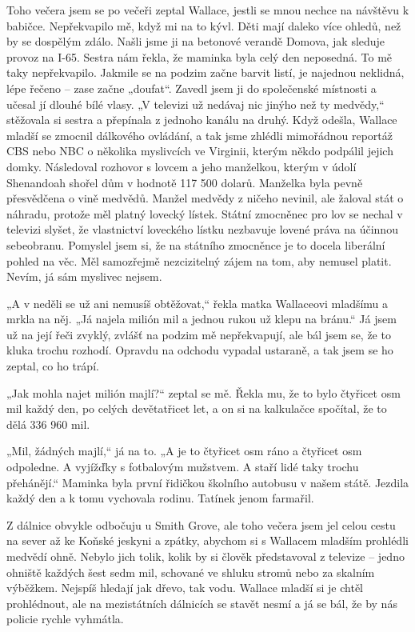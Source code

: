 Toho večera jsem se po večeři zeptal Wallace, jestli se mnou nechce na návštěvu k babičce. Nepřekvapilo mě, když mi na to kývl. Děti mají daleko více ohledů, než by se dospělým zdálo. Našli jsme ji na betonové verandě Domova, jak sleduje provoz na I-65. Sestra nám řekla, že maminka byla celý den neposedná. To mě taky nepřekvapilo. Jakmile se na podzim začne barvit listí, je najednou neklidná, lépe řečeno – zase začne „doufat“. Zavedl jsem ji do společenské místnosti a učesal jí dlouhé bílé vlasy. „V televizi už nedávaj nic jinýho než ty medvědy,“ stěžovala si sestra a přepínala z jednoho kanálu na druhý. Když odešla, Wallace mladší se zmocnil dálkového ovládání, a tak jsme zhlédli mimořádnou reportáž CBS nebo NBC o několika myslivcích ve Virginii, kterým někdo podpálil jejich domky. Následoval rozhovor s lovcem a jeho manželkou, kterým v údolí Shenandoah shořel dům v hodnotě 117 500 dolarů. Manželka byla pevně přesvědčena o vině medvědů. Manžel medvědy z ničeho nevinil, ale žaloval stát o náhradu, protože měl platný lovecký lístek. Státní zmocněnec pro lov se nechal v televizi slyšet, že vlastnictví loveckého lístku nezbavuje  lovené  práva na účinnou sebeobranu.  Pomyslel jsem si, že na státního zmocněnce je to docela liberální pohled na věc. Měl samozřejmě nezcizitelný zájem na tom, aby nemusel platit. Nevím, já sám myslivec nejsem.

„A v neděli se už ani nemusíš obtěžovat,“ řekla matka Wallaceovi mladšímu a mrkla na něj. „Já najela milión mil a jednou rukou už klepu na bránu.“ Já jsem už na její řeči zvyklý, zvlášť na podzim mě nepřekvapují, ale bál jsem se, že to kluka trochu rozhodí. Opravdu na odchodu vypadal ustaraně, a tak jsem se ho zeptal, co ho trápí.

„Jak mohla najet milión majlí?“ zeptal se mě. Řekla mu, že to bylo čtyřicet osm mil každý den, po celých devětatřicet let, a on si na kalkulačce spočítal, že to dělá 336 960 mil.

„Mil,  žádných majlí,“ já na to. „A je to čtyřicet osm ráno a čtyřicet osm odpoledne. A vyjížďky s fotbalovým mužstvem. A staří lidé taky trochu přehánějí.“ Maminka byla první řidičkou školního autobusu v našem státě. Jezdila každý den a k tomu vychovala rodinu. Tatínek jenom farmařil.

\bigskip

Z dálnice obvykle odbočuju u Smith Grove, ale toho večera jsem jel celou cestu na sever až ke Koňské jeskyni a zpátky, abychom si s Wallacem mladším prohlédli medvědí ohně. Nebylo jich tolik, kolik by si člověk představoval z televize – jedno ohniště každých šest sedm mil, schované ve shluku stromů nebo za skalním výběžkem. Nejspíš hledají jak dřevo, tak vodu. Wallace mladší si je chtěl prohlédnout, ale na mezistátních dálnicích se stavět nesmí a já se bál, že by nás policie rychle vyhmátla.

